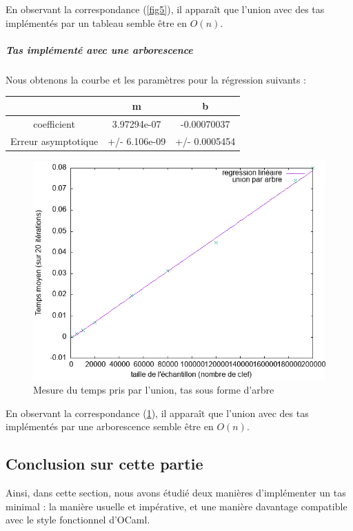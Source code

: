 \documentclass[12pt,a4paper]{article}
\begin{document}
En observant la correspondance (\ref{fig5}), il apparaît que l'union avec des tas implémentés par un tableau semble être en $O(n)$.


\subparagraph{Tas implémenté avec une arborescence}

Nous obtenons la courbe et les paramètres pour la régression suivants : 


\begin{center}
\begin{tabular}{|c|c|c|}
\hline
 & m & b \\
\hline
coefficient & 3.97294e-07 &-0.00070037 \\
Erreur asymptotique & +/- 6.106e-09 & +/- 0.0005454  \\
\hline
\end{tabular}
\end{center}


\begin{figure}[hbtp]
\centering
\includegraphics[scale=0.4]{../Images/svg courbes pour rapport/cplxt_union_arbre_regression.png}
\caption{Mesure du temps pris par l'union, tas sous forme d'arbre}
\label{fig6}
\end{figure}

En observant la correspondance (\ref{fig6}), il apparaît que l'union avec des tas implémentés par une arborescence semble être en $O(n)$.


\subsection{Conclusion sur cette partie}

Ainsi, dans cette section, nous avons étudié deux manières d'implémenter un tas minimal : la manière usuelle et impérative, et une manière davantage compatible avec le style fonctionnel d'OCaml.
\end{document}
